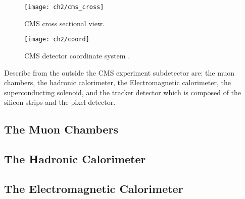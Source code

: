 \begin{figure}[!h]
	\centering
	\texttt{[image: ch2/cms\_cross]}
	\caption[CMS cross sectional view]{CMS cross sectional view.}
	\label{cmscross}
\end{figure}

\begin{figure}[h!]
	\centering
	\texttt{[image: ch2/coord]}
	\caption[CMS detector coordinate system]{CMS detector coordinate system \cite{and_the}.}
	\label{fig:coord}
\end{figure}

Describe from the outside the CMS experiment subdetector are: the muon chambers, the hadronic calorimeter, the Electromagnetic calorimeter, the superconducting solenoid, and the tracker detector which is composed of the silicon strips and the pixel detector.

\subsection{The Muon Chambers}

\subsection{The Hadronic Calorimeter}

\subsection{The Electromagnetic Calorimeter}

